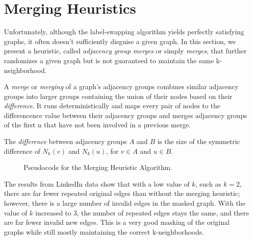 \section{Merging Heuristics}
\indent Unfortunately, although the label-swapping algorithm yields perfectly satisfying graphs, it often doesn't sufficiently disguise a given graph.  In this section, we present a heuristic, called \emph{adjacency group merges} or simply \emph{merges}, that further randomizes a given graph but is not guaranteed to maintain the same k-neighborhood. 

\begin{dfn}
\noindent A \emph{merge} or \emph{merging} of a graph's adjacency groups combines similar adjacency groups into larger groups containing the union of their nodes based on their \emph{difference}. It runs deterministically and maps every pair of nodes to  the differencence value between their adjacency groups and merges adjacency groups of the first n that have not been involved in a previous merge. \\
\end{dfn}

\begin{dfn}
The \emph{difference} between adjacency groups $A$ and $B$ is the size of the symmetric difference of $N_k(v)$ and $N_k(u)$, for $v \in A$ and $u \in B$. 
\end{dfn}

\begin{figure}[htb]
	\begin{algorithmic}
		\tiny
		\renewcommand{\algorithmicrequire}{\textbf{Input:}}
		\renewcommand{\algorithmicensure}{\textbf{Output:}}
			\EndFor
		\EndFor
		\EndFor
			\EndIf
		\EndIf
	\end{algorithmic}
	\caption{Pseudocode for the Merging Heuristic Algorithm.}
	\label{fig:merging}
\end{figure}

\indent The results from LinkedIn data show that with a low value of $k$, such as $k=2$, there are far fewer repeated original edges than without the merging heuristic; however, there is a large number of invalid edges in the masked graph. With the value of $k$ increased to $3$, the number of repeated edges stays the same, and there are far fewer invalid new edges. This is a very good masking of the original graphs while still mostly maintaining the correct k-neighborhoods. \\

